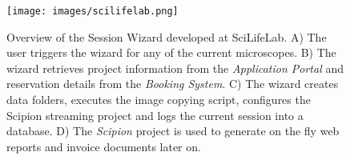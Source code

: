 \documentclass[a4paper,12pt]{article}
\def\scipion{\textit{Scipion}\xspace}
\def\scilifelab{SciLifeLab\xspace}
\begin{document}
\begin{reviewer}
\begin{figure}
\end{figure}
\begin{figure}
\texttt{[image: images/scilifelab.png]}
  \caption{Overview of the Session Wizard  developed at \scilifelab. A) The user triggers the wizard for any of the current microscopes. B) The wizard retrieves project information from the \textit{Application Portal} and reservation details from the \textit{Booking System}. C) The wizard creates data folders, executes the image copying script, configures the Scipion streaming project and logs the current session into a database. D) The \scipion project is used to generate on the fly web reports and invoice documents later on.}
  \label{fig:wizard}

\end{figure}
\clearpage



% 
% 
% 
% 
% 
% 
% 
% 
% 


\end{reviewer}
\end{document}

